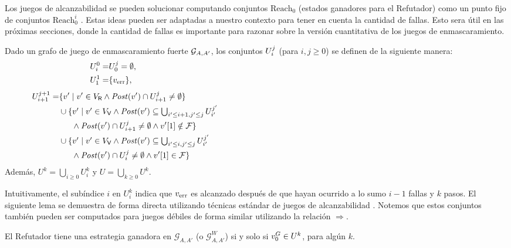 Los juegos de alcanzabilidad se pueden solucionar computando conjuntos $\text{Reach}_0$ (estados ganadores para el Refutador) como un punto fijo de conjuntos $\text{Reach}^i_0$  \cite{Jurd11}.
Estas ideas pueden ser adaptadas a nuestro contexto para tener en cuenta la cantidad de fallas. Esto sera útil en las próximas secciones, donde la cantidad de fallas es importante para razonar sobre la versión cuantitativa de los juegos de enmascaramiento.
\begin{definition}\label{def:U} Dado un grafo de juego de enmascaramiento fuerte $\mathcal{G}_{A, A'}$, 
los conjuntos $U^j_i$ (para $i,j \geq 0$) se definen de la siguiente manera:
\begin{align*}
  U^0_i =& U^j_0 = \emptyset,  \label{def:of:Uji} \\
  U_1^1 =&  \{\ErrorSt\},
  \hspace{12.5cm} {}\notag
\end{align*}
\vspace{-0.97cm}
\begin{align*}
  U_{i+1}^{j+1} =&
    \{v' \mid v' \in V_\Refuter \wedge \post(v') \cap U_{i+1}^j \neq \emptyset\} \\
    &\textstyle\cup
    \{v' \mid v' \in V_\Verifier \wedge \post(v') \subseteq \bigcup_{i'\leq i+1, j' \leq j}U_{i'}^{j'} \\
    &\phantom{==}\wedge \post(v') \cap U^j_{i+1} \neq \emptyset \wedge \pr{1}{v'} \notin \Faults \} \\
    &\textstyle \cup
    \{v' \mid  v' \in V_\Verifier \wedge \post(v') \subseteq \bigcup_{i'\leq i, j' \leq j}U_{i'}^{j'} \\
    &\phantom{==}\wedge \post(v') \cap \setsUs \neq \emptyset \wedge \pr{1}{v'} \in \Faults \}
    \hspace{12.5cm} {}\notag
\end{align*}
Además, $U^k = \bigcup_{i \geq 0} U_i^k$ y $U = \bigcup_{k \geq 0} U^k$.
\end{definition}
Intuitivamente, el subíndice $i$ en $U^k_i$ indica que $v_{\text{err}}$ es alcanzado después de que hayan ocurrido a lo sumo $i-1$ fallas y $k$ pasos.
El siguiente lema se demuestra de forma directa utilizando técnicas estándar de juegos de alcanzabilidad \cite{AlfaroHK07}.
Notemos que estos conjuntos también pueden ser computados para juegos débiles de forma similar utilizando la relación $\Rightarrow$.
\begin{lemma} \label{lm:RefWinStrat} El Refutador tiene una estrategia ganadora en $\mathcal{G}_{A, A'}$ (o $\mathcal{G}^W_{A, A'}$) si y solo si $v_0^G \in U^k$, para algún $k$.
\end{lemma}

